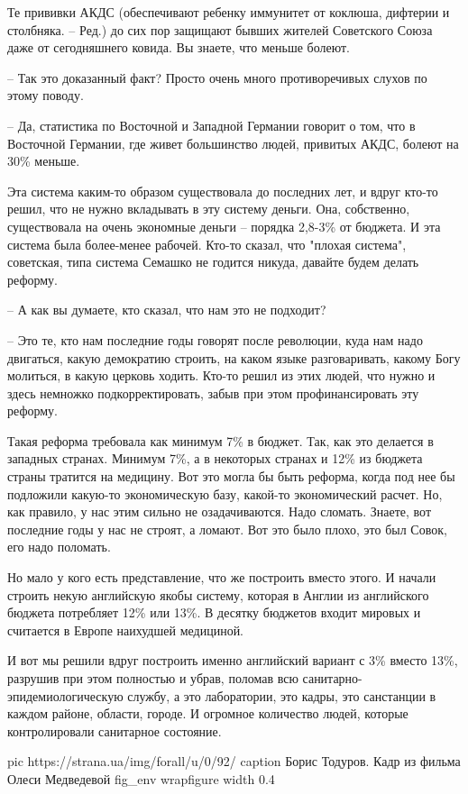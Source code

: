 Те прививки АКДС (обеспечивают ребенку иммунитет от коклюша, дифтерии и столбняка. – Ред.) до сих пор защищают бывших жителей Советского Союза даже от сегодняшнего ковида. Вы знаете, что меньше болеют. 

– Так это доказанный факт? Просто очень много противоречивых слухов по этому поводу. 

– Да, статистика по Восточной и Западной Германии говорит о том, что в
Восточной Германии, где живет большинство людей, привитых АКДС, болеют на 30\%
меньше. 

Эта система каким-то образом существовала до последних лет, и вдруг кто-то
решил, что не нужно вкладывать в эту систему деньги. Она, собственно,
существовала на очень экономные деньги – порядка 2,8-3\% от бюджета. И эта
система была более-менее рабочей. Кто-то сказал, что "плохая система",
советская, типа система Семашко не годится никуда, давайте будем делать
реформу.

– А как вы думаете, кто сказал, что нам это не подходит?

– Это те, кто нам последние годы говорят после революции, куда нам надо
двигаться, какую демократию строить, на каком языке разговаривать, какому Богу
молиться, в какую церковь ходить. Кто-то решил из этих людей, что нужно и здесь
немножко подкорректировать, забыв при этом профинансировать эту реформу. 

Такая реформа требовала как минимум 7\% в бюджет. Так, как это делается в
западных странах. Минимум 7\%, а в некоторых странах и 12\% из бюджета страны
тратится на медицину. Вот это могла бы быть реформа, когда под нее бы подложили
какую-то экономическую базу, какой-то экономический расчет. Но, как правило, у
нас этим сильно не озадачиваются. Надо сломать. Знаете, вот последние годы у
нас не строят, а ломают. Вот это было плохо, это был Совок, его надо поломать.

Но мало у кого есть представление, что же построить вместо этого. И начали
строить некую английскую якобы систему, которая в Англии из английского бюджета
потребляет 12\% или 13\%. В десятку бюджетов входит мировых и считается в
Европе наихудшей медициной.

И вот мы решили вдруг построить именно английский вариант с 3\% вместо 13\%,
разрушив при этом полностью и убрав, поломав всю санитарно-эпидемиологическую
службу, а это лаборатории, это кадры, это санстанции в каждом районе, области,
городе. И огромное количество людей, которые контролировали санитарное
состояние.

\ifcmt
pic https://strana.ua/img/forall/u/0/92/%
caption Борис Тодуров. Кадр из фильма Олеси Медведевой 
fig_env wrapfigure
width 0.4
\fi
